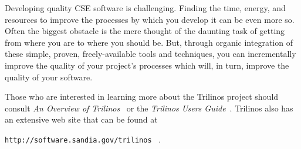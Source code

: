 \documentclass[12pt,relax]{article}
\newcommand{\InlineDirectory}[1]{
  {\hspace{0.01 in}} {\tt #1} {\hspace{0.01 in}}}
\begin{document}
Developing quality CSE software is challenging.  Finding the time, energy, and
resources to improve the processes by which you develop it can be even more so.
Often the biggest obstacle is the mere thought of the daunting task of getting
from where you are to where you should be.  But, through organic integration of
these simple, proven, freely-available tools and techniques, you can
incrementally improve the quality of your project's processes which will, in
turn, improve the quality of your software.

\clearpage


Those who are interested in learning more about the Trilinos project should 
consult {\it An Overview of Trilinos}~\cite{Trilinos-Overview} or the
{\it Trilinos Users Guide}~\cite{Trilinos-Users-Guide}.  Trilinos also has an 
extensive web site that can be found at \newline
\InlineDirectory{http://software.sandia.gov/trilinos}~\cite{Trilinos-home-page}.

\clearpage



%

\end{document}
